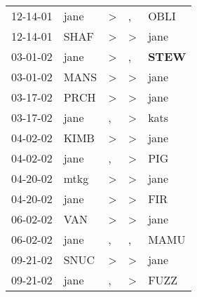 \begin{supertabular}{p{0.07\textwidth}p{0.06\textwidth}p{0.02\textwidth}p{0.02\textwidth}p{0.06\textwidth}}
          12-14-01\textsuperscript{} &           jane\textsuperscript{} &     \textgreater &                , &           OBLI\textsuperscript{} \\
          12-14-01\textsuperscript{} &           SHAF\textsuperscript{} &     \textgreater &     \textgreater &           jane\textsuperscript{} \\
          03-01-02\textsuperscript{} &           jane\textsuperscript{} &     \textgreater &                , &  \textbf{STEW\textsuperscript{}} \\
          03-01-02\textsuperscript{} &           MANS\textsuperscript{} &     \textgreater &     \textgreater &           jane\textsuperscript{} \\
          03-17-02\textsuperscript{} &           PRCH\textsuperscript{} &     \textgreater &     \textgreater &           jane\textsuperscript{} \\
          03-17-02\textsuperscript{} &           jane\textsuperscript{} &                , &     \textgreater &           kats\textsuperscript{} \\
          04-02-02\textsuperscript{} &           KIMB\textsuperscript{} &     \textgreater &     \textgreater &           jane\textsuperscript{} \\
          04-02-02\textsuperscript{} &           jane\textsuperscript{} &                , &     \textgreater &            PIG\textsuperscript{} \\
          04-20-02\textsuperscript{} &           mtkg\textsuperscript{} &     \textgreater &     \textgreater &           jane\textsuperscript{} \\
          04-20-02\textsuperscript{} &           jane\textsuperscript{} &     \textgreater &     \textgreater &            FIR\textsuperscript{} \\
          06-02-02\textsuperscript{} &            VAN\textsuperscript{} &     \textgreater &     \textgreater &           jane\textsuperscript{} \\
          06-02-02\textsuperscript{} &           jane\textsuperscript{} &                , &                , &           MAMU\textsuperscript{} \\
          09-21-02\textsuperscript{} &           SNUC\textsuperscript{} &     \textgreater &     \textgreater &           jane\textsuperscript{} \\
          09-21-02\textsuperscript{} &           jane\textsuperscript{} &                , &     \textgreater &           FUZZ\textsuperscript{} \\

\end{supertabular}
